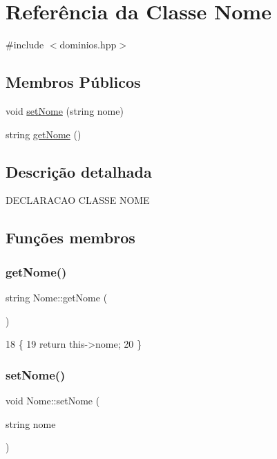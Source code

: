 \hypertarget{class_nome}{}\section{Referência da Classe Nome}
\label{class_nome}


{\ttfamily \#include $<$dominios.\+hpp$>$}

\subsection*{Membros Públicos}
\begin{DoxyCompactItemize}
\item 
void \mbox{\hyperlink{class_nome_a83b9f56ec9f86f4b976846f4c5c65b30}{set\+Nome}} (string nome)
\item 
string \mbox{\hyperlink{class_nome_aad41176173eec20cbbae1576447a3697}{get\+Nome}} ()
\end{DoxyCompactItemize}


\subsection{Descrição detalhada}
D\+E\+C\+L\+A\+R\+A\+C\+AO C\+L\+A\+S\+SE N\+O\+ME 

\subsection{Funções membros}
\mbox{\label{class_nome_aad41176173eec20cbbae1576447a3697}} 
\subsubsection{\texorpdfstring{get\+Nome()}{getNome()}}
{\footnotesize\ttfamily string Nome\+::get\+Nome (\begin{DoxyParamCaption}{ }\end{DoxyParamCaption})}


\begin{DoxyCode}
18 \{
19   \textcolor{keywordflow}{return} this->nome;
20 \}
\end{DoxyCode}
\mbox{\label{class_nome_a83b9f56ec9f86f4b976846f4c5c65b30}} 
\subsubsection{\texorpdfstring{set\+Nome()}{setNome()}}
{\footnotesize\ttfamily void Nome\+::set\+Nome (\begin{DoxyParamCaption}\item[{string}]{nome }\end{DoxyParamCaption})}

